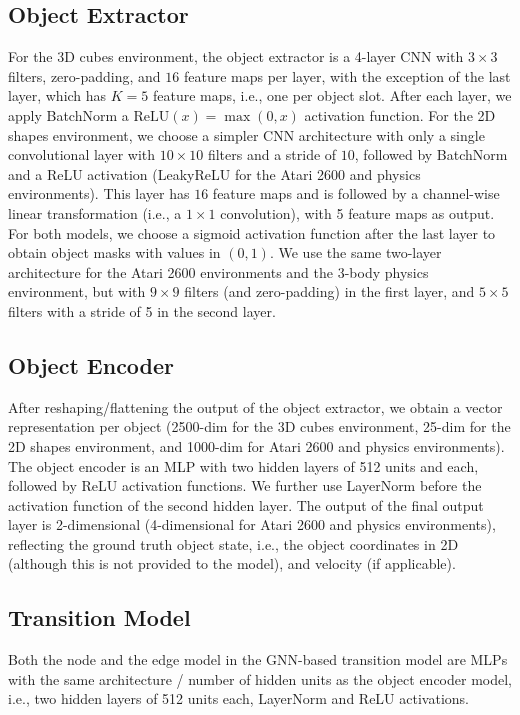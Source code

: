 \documentclass{article} %
\begin{document}
\subsection{Object Extractor}
For the 3D cubes environment, the object extractor is a 4-layer CNN with $3\times 3$ filters, zero-padding, and $16$ feature maps per layer, with the exception of the last layer, which has $K=5$ feature maps, i.e., one per object slot. After each layer, we apply BatchNorm \citep{ioffe2015batch} a $\mathrm{ReLU}(x)=\max(0,x)$ activation function. For the 2D shapes environment, we choose a simpler CNN architecture with only a single convolutional layer with $10\times 10$ filters and a stride of $10$, followed by BatchNorm and a ReLU activation (LeakyReLU \citep{xu2015empirical} for the Atari 2600 and physics environments). This layer has $16$ feature maps and is followed by a channel-wise linear transformation (i.e., a $1\times1$ convolution), with 5 feature maps as output. For both models, we choose a sigmoid activation function after the last layer to obtain object masks with values in $(0, 1)$. We use the same two-layer architecture for the Atari 2600 environments and the 3-body physics environment, but with $9\times9$ filters (and zero-padding) in the first layer, and $5\times5$ filters with a stride of 5 in the second layer.

\subsection{Object Encoder}
After reshaping/flattening the output of the object extractor, we obtain a vector representation per object (2500-dim for the 3D cubes environment, 25-dim for the 2D shapes environment, and 1000-dim for Atari 2600 and physics environments). The object encoder is an MLP with two hidden layers of 512 units and each, followed by ReLU activation functions. We further use LayerNorm \citep{ba2016layer} before the activation function of the second hidden layer.  The output of the final output layer is 2-dimensional (4-dimensional for Atari 2600 and physics environments), reflecting the ground truth object state, i.e., the object coordinates in 2D (although this is not provided to the model), and velocity (if applicable).

\subsection{Transition Model}
Both the node and the edge model in the GNN-based transition model are MLPs with the same architecture / number of hidden units as the object encoder model, i.e., two hidden layers of 512 units each, LayerNorm and ReLU activations.
\end{document}
